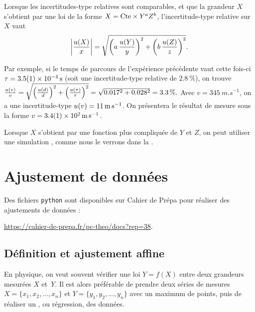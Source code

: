 \begin{liste}
Lorsque les incertitudes-type relatives sont comparables, et que la grandeur $X$ s’obtient par une loi de la forme $X = \text{Cte} \times Y^a Z^b$, l’incertitude-type relative sur $X$ vaut
\begin{equation}\norm{\frac{\incertX x}{x}} = \sqrt{\left(a \,\frac{\incertX y}{y}\right)^2 + \left(b \, \frac{\incertX Z}{z}\right)^2}.
\end{equation}
\begin{remarque}
Par exemple, si le temps de parcours de l’expérience précédente vaut cette fois-ci $\tau=\SI{3.5\pm 0.1e-4}{s}$ (soit une incertitude-type relative de $\SI{2.8}{\%}$), on trouve
$
\frac{u(v)}{v} = \sqrt{\left( \frac{u(d)}{d}\right)^2 + \left( \frac{u(\tau)}{\tau}\right)^2} = \sqrt{\num{0.017}^2+\num{0.028}^2} = \SI{3.3}{\%}.
$
Avec $v=\SI{345}{m.s^{-1}}$, on a
une incertitude-type $u(v) = \SI{11}{m.s^{-1}}$. On présentera le résultat de mesure sous la forme $ v = \SI{3.4\pm 0.1e2}{m.s^{-1}}$.
\end{remarque}

\item Lorsque $X$ s’obtient par une fonction plus compliquée de $Y$ et $Z$, %
on peut utiliser une simulation , comme nous  le verrons dans la .
 \end{liste}

\section{Ajustement de données}
Des fichiers \texttt{python} sont disponibles sur Cahier de Prépa pour réaliser des ajustements de données : 
\begin{center}
  \href{https://cahier-de-prepa.fr/pc-theo/docs?rep=38}{https://cahier-de-prepa.fr/pc-theo/docs?rep=38}.
\end{center}

\subsection{Définition et ajustement affine}
\label{sec:ajust}
En physique, on veut souvent vérifier une loi $Y=f(X)$ entre deux grandeurs mesurées $X$ et~$Y$. Il est alors préférable de prendre deux séries de mesures $X=\{x_1,x_2,...,x_n\}$ et $Y=\{y_1,y_2,...,y_n\}$ avec un maximum de points, puis de réaliser un , ou régression, des données.

